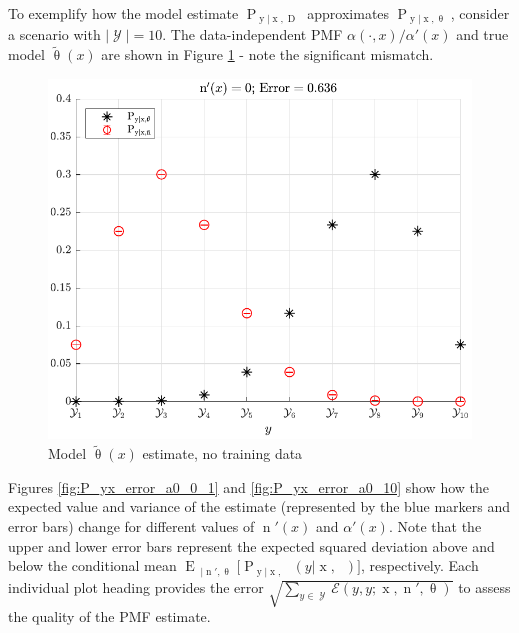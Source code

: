 \documentclass[conference]{IEEEtran}
\DeclareMathOperator{\xrm}{\mathrm{x}}
\DeclareMathOperator{\yrm}{\mathrm{y}}
\DeclareMathOperator{\Drm}{\mathrm{D}}
\DeclareMathOperator{\nrm}{\mathrm{n}}
\DeclareMathOperator{\nbarrm}{\bar{\mathrm{n}}}
\DeclareMathOperator{\Prm}{\mathrm{P}}
\DeclareMathOperator{\Erm}{\mathrm{E}}
\DeclareMathOperator{\Ycal}{\mathcal{Y}}
\begin{document}
To exemplify how the model estimate $\Prm_{\yrm | \xrm,\Drm}$ approximates $\Prm_{\yrm | \xrm,\uptheta}$, consider a scenario with $|\Ycal| = 10$. The data-independent PMF $\alpha(\cdot,x)/\alpha'(x)$ and true model $\tilde{\uptheta}(x)$ are shown in Figure \ref{fig:P_yx_error_N_0} - note the significant mismatch. 

\begin{figure}
\centering
\includegraphics[width=0.9\linewidth]{P_yx_error_N_0.pdf}
\caption{Model $\tilde{\uptheta}(x)$ estimate, no training data}
\label{fig:P_yx_error_N_0}
\end{figure}

Figures \ref{fig:P_yx_error_a0_0_1} and \ref{fig:P_yx_error_a0_10} show how the expected value and variance of the estimate (represented by the blue markers and error bars) change for different values of $\nrm'(x)$ and $\alpha'(x)$. Note that the upper and lower error bars represent the expected squared deviation above and below the conditional mean $\Erm_{\nbarrm | \nrm',\uptheta}\big[ \Prm_{\yrm | \xrm,\nbarrm}(y | \xrm,\nbarrm) \big]$, respectively. Each individual plot heading provides the error $\sqrt{\sum_{y \in \Ycal} \mathcal{E}(y,y ; \xrm,\nrm',\uptheta)}$ to assess the quality of the PMF estimate. 
\end{document}
